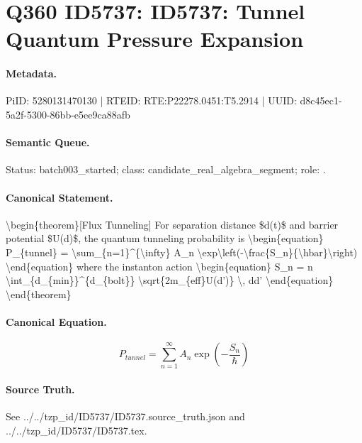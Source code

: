 \section*{Q360 ID5737: ID5737: Tunnel Quantum Pressure Expansion}
\paragraph{Metadata.}
PiID: 5280131470130 | RTEID: RTE:P22278.0451:T5.2914 | UUID: d8c45ec1-5a2f-5300-86bb-e5ee9ca88afb

\paragraph{Semantic Queue.}
Status: batch003\_started; class: candidate\_real\_algebra\_segment; role: .

\paragraph{Canonical Statement.}
\textbackslash{}begin\{theorem\}[Flux Tunneling] For separation distance \$d(t)\$ and barrier potential \$U(d)\$, the quantum tunneling probability is \textbackslash{}begin\{equation\} P\_\{tunnel\} = \textbackslash{}sum\_\{n=1\}\textasciicircum{}\{\textbackslash{}infty\} A\_n \textbackslash{}exp\textbackslash{}left(-\textbackslash{}frac\{S\_n\}\{\textbackslash{}hbar\}\textbackslash{}right) \textbackslash{}end\{equation\} where the instanton action \textbackslash{}begin\{equation\} S\_n = n \textbackslash{}int\_\{d\_\{min\}\}\textasciicircum{}\{d\_\{bolt\}\} \textbackslash{}sqrt\{2m\_\{eff\}U(d')\} \textbackslash{}, dd' \textbackslash{}end\{equation\} \textbackslash{}end\{theorem\}

\paragraph{Canonical Equation.}
\[
\begin{equation} P_{tunnel} = \sum_{n=1}^{\infty} A_n \exp\left(-\frac{S_n}{\hbar}\right) \end{equation}
\]

\paragraph{Source Truth.}
See ../../tzp\_id/ID5737/ID5737.source\_truth.json and ../../tzp\_id/ID5737/ID5737.tex.
